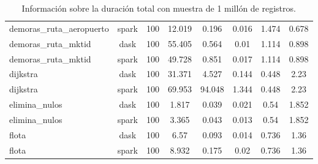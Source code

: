 \begin{table}
{\begin{tabular}{|l|c c c c c c c|}
        demoras\_ruta\_aeropuerto & spark & 100 & 12.019 & 0.196 & 0.016 & 1.474 & 0.678 \\ %
        demoras\_ruta\_mktid & dask & 100 & 55.405 & 0.564 & 0.01 & 1.114 & 0.898 \\ %
        demoras\_ruta\_mktid & spark & 100 & 49.728 & 0.851 & 0.017 & 1.114 & 0.898 \\ %
        dijkstra & dask & 100 & 31.371 & 4.527 & 0.144 & 0.448 & 2.23 \\ %
        dijkstra & spark & 100 & 69.953 & 94.048 & 1.344 & 0.448 & 2.23 \\ %
        elimina\_nulos & dask & 100 & 1.817 & 0.039 & 0.021 & 0.54 & 1.852 \\ %
        elimina\_nulos & spark & 100 & 3.365 & 0.043 & 0.013 & 0.54 & 1.852 \\ %
        flota & dask & 100 & 6.57 & 0.093 & 0.014 & 0.736 & 1.36 \\ %
        flota & spark & 100 & 8.932 & 0.175 & 0.02 & 0.736 & 1.36 \\ \hline
    \end{tabular}}
    \caption{Información sobre la duración total con muestra de 1 millón de registros.}
    \label{table:duracion1M}
\end{table}


